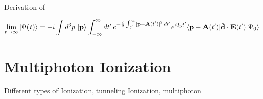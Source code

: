 Derivation of 

\begin{equation}
    \lim_{t \to \infty} \ket{\Psi(t)}  = -i \int d^3 p\, \ket{\mathbf{p}} \int_{-\infty}^{\infty} dt'\, e^{-\frac{i}{2}\int_{t'}^{\infty} [\mathbf{p}+\mathbf{A}(t')]^2 \, dt'} e^{i I_\mathrm{p} t'} \langle \mathbf{p} + \mathbf{A}(t') | \hat{\mathbf{d}} \cdot \mathbf{E}(t') | \Psi_0 \rangle
\end{equation}



\newpage
\section{Multiphoton Ionization}

Different types of Ionization, tunneling Ionization, multiphoton